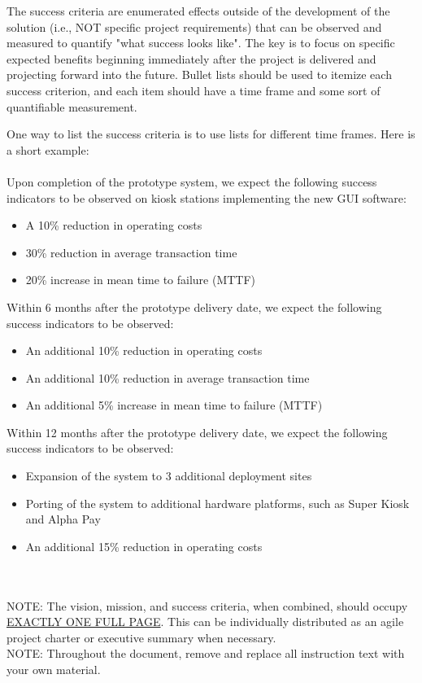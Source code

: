 The success criteria are enumerated effects outside of the development of the solution (i.e., NOT specific project requirements) that can be observed and measured to quantify "what success looks like". The key is to focus on specific expected benefits beginning immediately after the project is delivered and projecting forward into the future. Bullet lists should be used to itemize each success criterion, and each item should have a time frame and some sort of quantifiable measurement.

One way to list the success criteria is to use lists for different time frames. Here is a short example:
\\
\\
Upon completion of the prototype system, we expect the following success indicators to be observed on kiosk stations implementing the new GUI software:
\begin{itemize}
  \item A 10\% reduction in operating costs
  \item 30\% reduction in average transaction time
  \item 20\% increase in mean time to failure (MTTF)
\end{itemize}

Within 6 months after the prototype delivery date, we expect the following success indicators to be observed:
\begin{itemize}
  \item An additional 10\% reduction in operating costs
  \item An additional 10\% reduction in average transaction time
  \item An additional 5\% increase in mean time to failure (MTTF)
\end{itemize}

Within 12 months after the prototype delivery date, we expect the following success indicators to be observed:
\begin{itemize}
  \item Expansion of the system to 3 additional deployment sites
  \item Porting of the system to additional hardware platforms, such as Super Kiosk and Alpha Pay
  \item An additional 15\% reduction in operating costs
\end{itemize}
\\
\\
NOTE: The vision, mission, and success criteria, when combined, should occupy \underline{EXACTLY ONE FULL PAGE}. This can be individually distributed as an agile project charter or executive summary when necessary. 
\\
NOTE: Throughout the document, remove and replace all instruction text with your own material. 
